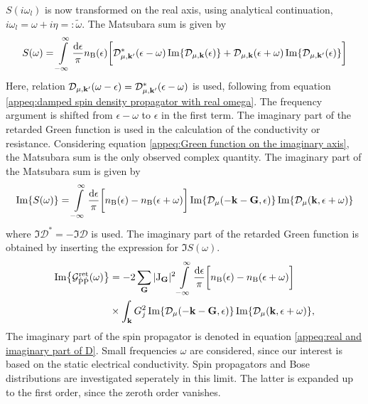 %
$S(i\omega_{l})$ is now transformed on the real axis, using analytical continuation, $i\omega_{l} = \omega + i\eta =: \tilde{\omega}$.
The Matsubara sum is given by
%
\begin{align}
	S(\omega) = \int\limits_{-\infty}^{\infty} \frac{\dd{\epsilon}}{\pi} 
			n_{\mathrm{B}}(\epsilon) 
			\bigg[
				\mathcal{D}_{\mu,\vb{k}'}^{*}(\epsilon - \omega) \Im{\mathcal{D}_{\mu, \vb{k}}(\epsilon)}
				+ 
				\mathcal{D}_{\mu,\vb{k}}(\epsilon + \omega) \Im{\mathcal{D}_{\mu, \vb{k}'}(\epsilon)}
			\bigg]
\end{align}
%
Here, relation $\mathcal{D}_{\mu,\vb{k}'}(\omega - \epsilon) = \mathcal{D}_{\mu,\vb{k}'}^{*}(\epsilon - \omega)$ is used, following from equation \eqref{appeq:damped spin density propagator with real omega}.
The frequency argument is shifted from $\epsilon - \omega$ to $\epsilon$ in the first term.
The imaginary part of the retarded Green function is used in the calculation of the conductivity or resistance.
Considering equation \eqref{appeq:Green function on the imaginary axis}, the Matsubara sum is the only observed complex quantity.
The imaginary part of the Matsubara sum is given by
%
\begin{align}
	\Im{S(\omega)} = 
		\int\limits_{-\infty}^{\infty} \frac{\dd{\epsilon}}{\pi} 
		\bigg[ n_{\mathrm{B}}(\epsilon) - n_{\mathrm{B}}(\epsilon + \omega)\bigg] 
		\Im{\mathcal{D}_{\mu}(-\vb{k}-\vb{G},\epsilon)} 
		\Im{\mathcal{D}_{\mu}(\vb{k}, \epsilon + \omega)}
\end{align}
%
where $\Im{\mathcal{D}^{*}} = - \Im{\mathcal{D}}$ is used.
The imaginary part of the retarded Green function is obtained by inserting the expression for $\Im{S(\omega)}$.
%
\begin{align}
	\Im{\mathcal{G}_{\dot{\mathrm{P}}\dot{\mathrm{P}}}^{\mathrm{ret}}(\omega)} &= 
		-2 
		\sum\limits_{\vb{G}} 
		\vert \mathrm{J}_{\vb{G}} \vert^{2}
		\int\limits_{-\infty}^{\infty} \frac{\dd{\epsilon}}{\pi} 
		\bigg[n_{\mathrm{B}}(\epsilon) - n_{\mathrm{B}}(\epsilon + \omega)\bigg]
		\notag \\
		&\times
		\int_{\vb{k}} G_{j}^{2}
		\Im{\mathcal{D}_{\mu}(-\vb{k}-\vb{G},\epsilon)} 
		\Im{\mathcal{D}_{\mu}(\vb{k}, \epsilon + \omega)},
\end{align}
%
The imaginary part of the spin propagator is denoted in equation \eqref{appeq:real and imaginary part of D}.
Small frequencies $\omega$ are considered, since our interest is based on the static electrical conductivity.
Spin propagators and Bose distributions are investigated seperately in this limit.
The latter is expanded up to the first order, since the zeroth order vanishes.
